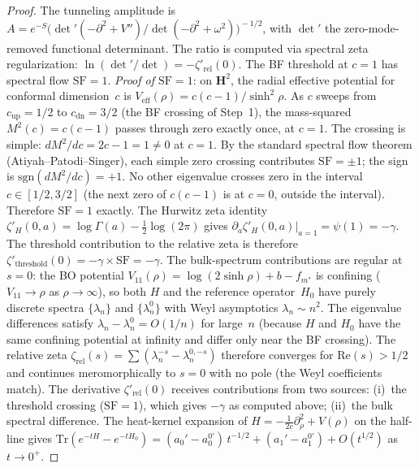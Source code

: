 \begin{proof}
The tunneling amplitude is
$A = e^{-S}\bigl(\det'(-\partial^2 + V'')/\det(-\partial^2+\omega^2)
\bigr)^{\!-1/2}$,
with $\det'$ the zero-mode-removed functional determinant.
The ratio is computed via spectral zeta regularization:
$\ln(\det'/\det) = -\zeta'_{\mathrm{rel}}(0)$.
The BF threshold at $c = 1$ has spectral flow $\mathrm{SF} = 1$.
\emph{Proof of $\mathrm{SF} = 1$}:
on $\mathbf{H}^2$, the radial effective potential
for conformal dimension~$c$ is $V_{\mathrm{eff}}(\rho)
= c(c{-}1)/\sinh^2\!\rho$.
As $c$ sweeps from $c_{\mathrm{up}} = 1/2$ to
$c_{\mathrm{dn}} = 3/2$ (the BF crossing of Step~1),
the mass-squared $M^2(c) = c(c{-}1)$ passes through zero
exactly once, at $c = 1$.
The crossing is simple: $dM^2/dc = 2c{-}1 = 1 \ne 0$ at $c = 1$.
By the standard spectral flow theorem (Atiyah--Patodi--Singer),
each simple zero crossing contributes $\mathrm{SF} = \pm 1$;
the sign is $\mathrm{sgn}(dM^2/dc) = +1$.
No other eigenvalue crosses zero in the interval
$c \in [1/2, 3/2]$ (the next zero of $c(c{-}1)$ is at
$c = 0$, outside the interval).
Therefore $\mathrm{SF} = 1$ exactly.
The Hurwitz zeta identity
$\zeta'_H(0, a) = \log\Gamma(a) - \tfrac{1}{2}\log(2\pi)$
gives $\partial_a \zeta'_H(0,a)\big|_{a=1} = \psi(1) = -\gamma$.
The threshold contribution to the relative zeta is therefore
$\zeta'_{\mathrm{threshold}}(0) = -\gamma \times \mathrm{SF} = -\gamma$.
The bulk-spectrum contributions are regular at $s = 0$:
the BO potential
$V_{11}(\rho) = \log(2\sinh\rho) + b - f_{m^*}$
is confining ($V_{11} \to \rho$ as $\rho \to \infty$),
so both $H$ and the reference operator~$H_0$ have purely
discrete spectra $\{\lambda_n\}$ and $\{\lambda_n^0\}$
with Weyl asymptotics $\lambda_n \sim n^2$.
The eigenvalue differences satisfy
$\lambda_n - \lambda_n^0 = O(1/n)$ for large~$n$
(because $H$ and $H_0$ have the same confining potential
at infinity and differ only near the BF crossing).
The relative zeta
$\zeta_{\mathrm{rel}}(s) = \sum(\lambda_n^{-s} - \lambda_n^{0,-s})$
therefore converges for $\mathrm{Re}(s) > 1/2$
and continues meromorphically to $s = 0$
with no pole (the Weyl coefficients match).
The derivative $\zeta'_{\mathrm{rel}}(0)$
receives contributions from two sources:
(i)~the threshold crossing ($\mathrm{SF} = 1$),
which gives $-\gamma$ as computed above;
(ii)~the bulk spectral difference.
The heat-kernel expansion of $H = -\tfrac{1}{2c}\partial_\rho^2
+ V(\rho)$ on the half-line gives
$\mathrm{Tr}(e^{-tH} - e^{-tH_0})
= (a_0' - a_0^{0\prime})\,t^{-1/2}
+ (a_1' - a_1^{0\prime})
+ O(t^{1/2})$
as $t \to 0^+$.

\end{proof}
